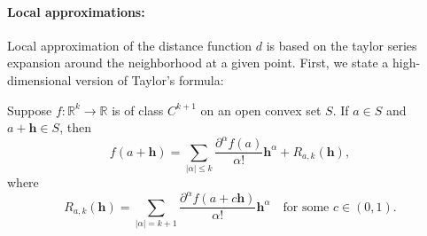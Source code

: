 \paragraph{Local approximations:} Local approximation of the distance function $d$ is based on the taylor series expansion around the neighborhood at a given point. First, we state a high-dimensional version of Taylor's formula:
\begin{theorem}\label{thm:taylorseries}
Suppose \( f : \mathbb{R}^k \rightarrow \mathbb{R} \) is of class \( C^{k+1} \) on an open convex set \( S \).
If \( a \in S \) and \( a + \mathbf{h} \in S \), then
\begin{equation}
f(a + \mathbf{h}) = \sum_{|\alpha| \leq k} \frac{\partial^\alpha f(a)}{\alpha!} \mathbf{h}^\alpha + R_{a,k}(\mathbf{h}),
\end{equation}
where
\begin{equation}
R_{a,k}(\mathbf{h}) = \sum_{|\alpha| = k+1} \frac{\partial^\alpha f(a + c\mathbf{h})}{\alpha!} \mathbf{h}^\alpha \quad \text{for some } c \in (0, 1). \label{eq: rem}
\end{equation}
\end{theorem}


